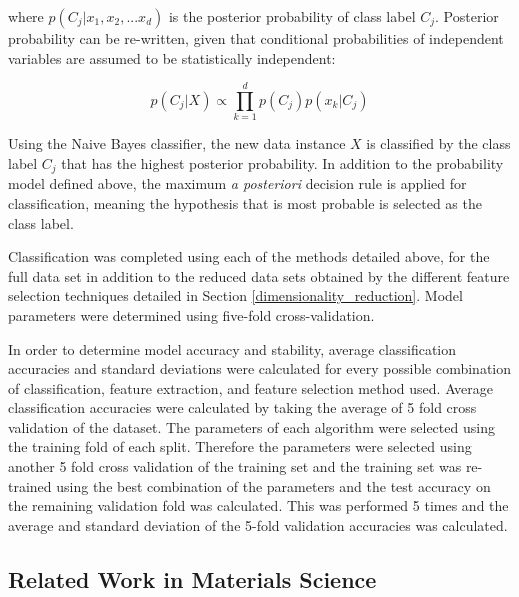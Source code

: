 where $p(C_{j}|x_{1}, x_{2}, ... x_{d})$ is the posterior probability of class label $C_{j}$. Posterior probability can be re-written, given that conditional probabilities of independent variables are assumed to be statistically independent: 

\begin{equation}
p(C_{j}|X) \propto \prod_{k=1}^{d} p(C_{j}) p(x_{k}|C_{j})
\end{equation}

Using the Naive Bayes classifier, the new data instance $X$ is classified by the class label $C_{j}$ that has the highest posterior probability. In addition to the probability model defined above, the maximum \textit{a posteriori} decision rule is applied for classification, meaning the hypothesis that is most probable is selected as the class label.

Classification was completed using each of the methods detailed above, for the full data set in addition to the reduced data sets obtained by the different feature selection techniques detailed in Section \ref{dimensionality_reduction}.  Model parameters were determined using five-fold cross-validation.  

In order to determine model accuracy and stability, average classification accuracies and standard deviations were calculated for every possible combination of classification, feature extraction, and feature selection method used.  Average classification accuracies were calculated by taking the average of 5 fold cross validation of the dataset. The parameters of each algorithm were selected using the training fold of each split. Therefore the parameters were selected using another 5 fold cross validation of the training set and the training set was re-trained using the best combination of the parameters and the test accuracy on the remaining validation fold was calculated. This was performed 5 times and the average and standard deviation of the 5-fold validation accuracies was calculated.

\subsection{Related Work in Materials Science}
\label{related_work}


